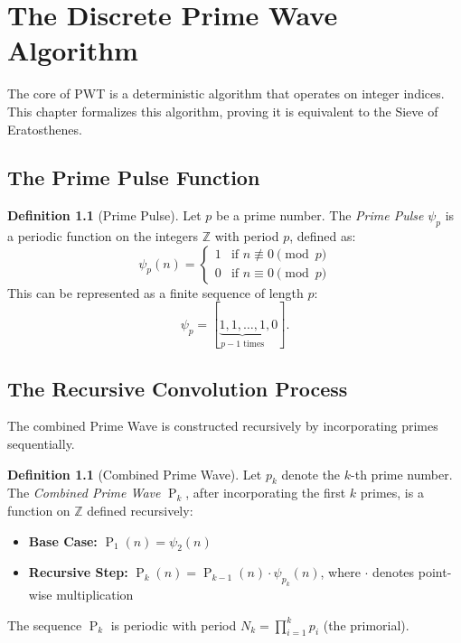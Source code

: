 ﻿\documentclass[12pt,a4paper]{report}
\theoremstyle{plain}
\theoremstyle{definition}
\newtheorem{definition}[theorem]{Definition}
\newcommand{\Z}{\mathbb{Z}}
\DeclareMathOperator{\Pk}{P}
\begin{document}
\chapter{The Discrete Prime Wave Algorithm}
\label{ch:discrete}

The core of PWT is a deterministic algorithm that operates on integer indices. This chapter formalizes this algorithm, proving it is equivalent to the Sieve of Eratosthenes.

\section{The Prime Pulse Function}

\begin{definition}[Prime Pulse]
\label{def:prime_pulse}
Let $p$ be a prime number. The \emph{Prime Pulse} $\psi_p$ is a periodic function on the integers $\Z$ with period $p$, defined as:
\[
\psi_p(n) = \begin{cases}
1 & \text{if } n \not\equiv 0 \pmod{p} \\
0 & \text{if } n \equiv 0 \pmod{p}
\end{cases}
\]
This can be represented as a finite sequence of length $p$: 
\[
\psi_p = [\underbrace{1, 1, \ldots, 1}_{p-1 \text{ times}}, 0].
\]
\end{definition}

\section{The Recursive Convolution Process}

The combined Prime Wave is constructed recursively by incorporating primes sequentially.

\begin{definition}[Combined Prime Wave]
\label{def:combined_wave}
Let $p_k$ denote the $k$-th prime number. The \emph{Combined Prime Wave} $\Pk_k$, after incorporating the first $k$ primes, is a function on $\Z$ defined recursively:
\begin{itemize}
    \item \textbf{Base Case:} $\Pk_1(n) = \psi_2(n)$
    \item \textbf{Recursive Step:} $\Pk_k(n) = \Pk_{k-1}(n) \cdot \psi_{p_k}(n)$, where $\cdot$ denotes point-wise multiplication
\end{itemize}
The sequence $\Pk_k$ is periodic with period $N_k = \prod_{i=1}^k p_i$ (the primorial).
\end{definition}
\end{document}
